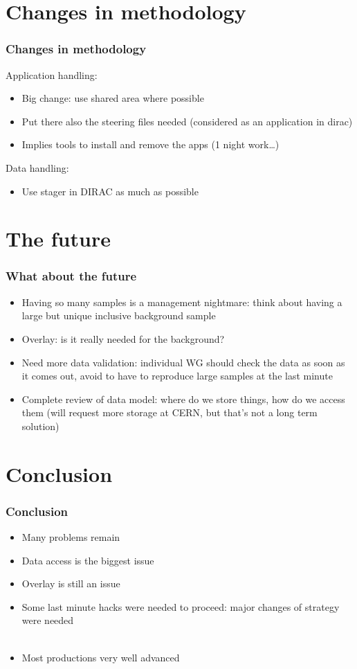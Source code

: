 \documentclass{beamer}
\begin{document}
\section{Changes in methodology}
\begin{frame}
\frametitle{Changes in methodology}
Application handling:
\begin{itemize}
  \item Big change: use shared area where possible
  \item Put there also the steering files needed (considered as an
  application in dirac)
  \item Implies tools to install and remove the apps (1 night work\ldots)
\end{itemize}
Data handling:
\begin{itemize}
  \item Use stager in DIRAC as much as possible
\end{itemize}
\end{frame}
\section{The future}
\begin{frame}
\frametitle{What about the future}
\begin{itemize}
  \item Having so many samples is a management nightmare: think about having a
  large but unique inclusive background sample
  \item Overlay: is it really needed for the background? 
  \item Need more data validation: individual WG should check the data as soon
  as it comes out, avoid to have to reproduce large samples at the last minute
  \item Complete review of data model: where do we store things, how do we
  access them (will request more storage at CERN, but that's not a long term
  solution)
\end{itemize}
\end{frame}
\section{Conclusion}
\begin{frame}
\frametitle{Conclusion}
\begin{itemize}
  \item Many problems remain
  \item Data access is the biggest issue
  \item Overlay is still an issue
  \item Some last minute hacks were needed to proceed: major changes of strategy
  were needed\\~\\
  \item Most productions very well advanced
\end{itemize}
\end{frame}
\end{document}
